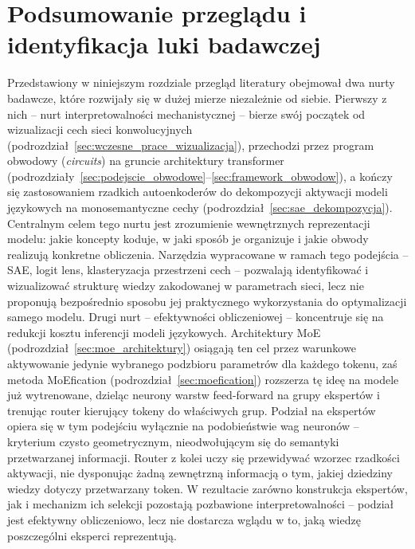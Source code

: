 \section{Podsumowanie przeglądu i identyfikacja luki badawczej}
\label{sec:podsumowanie_przegladu}
Przedstawiony w niniejszym rozdziale przegląd literatury obejmował dwa nurty badawcze, które rozwijały się w dużej mierze niezależnie od siebie. Pierwszy z nich -- nurt interpretowalności mechanistycznej -- bierze swój początek od wizualizacji cech sieci konwolucyjnych (podrozdział~\ref{sec:wczesne_prace_wizualizacja}), przechodzi przez program obwodowy (\textit{circuits}) na gruncie architektury transformer (podrozdziały~\ref{sec:podejscie_obwodowe}--\ref{sec:framework_obwodow}), a kończy się zastosowaniem rzadkich autoenkoderów do dekompozycji aktywacji modeli językowych na monosemantyczne cechy (podrozdział~\ref{sec:sae_dekompozycja}). Centralnym celem tego nurtu jest zrozumienie wewnętrznych reprezentacji modelu: jakie koncepty koduje, w jaki sposób je organizuje i jakie obwody realizują konkretne obliczenia. Narzędzia wypracowane w ramach tego podejścia -- SAE, logit lens, klasteryzacja przestrzeni cech -- pozwalają identyfikować i wizualizować strukturę wiedzy zakodowanej w parametrach sieci, lecz nie proponują bezpośrednio sposobu jej praktycznego wykorzystania do optymalizacji samego modelu. \newline
Drugi nurt -- efektywności obliczeniowej -- koncentruje się na redukcji kosztu inferencji modeli językowych. Architektury MoE (podrozdział~\ref{sec:moe_architektury}) osiągają ten cel przez warunkowe aktywowanie jedynie wybranego podzbioru parametrów dla każdego tokenu, zaś metoda MoEfication (podrozdział~\ref{sec:moefication}) rozszerza tę ideę na modele już wytrenowane, dzieląc neurony warstw feed-forward na grupy ekspertów i trenując router kierujący tokeny do właściwych grup. Podział na ekspertów opiera się w tym podejściu wyłącznie na podobieństwie wag neuronów \cite{zhang_2022_moefication} -- kryterium czysto geometrycznym, nieodwołującym się do semantyki przetwarzanej informacji. Router z kolei uczy się przewidywać wzorzec rzadkości aktywacji, nie dysponując żadną zewnętrzną informacją o tym, jakiej dziedziny wiedzy dotyczy przetwarzany token. W rezultacie zarówno konstrukcja ekspertów, jak i mechanizm ich selekcji pozostają pozbawione interpretowalności -- podział jest efektywny obliczeniowo, lecz nie dostarcza wglądu w to, jaką wiedzę poszczególni eksperci reprezentują. \newline
